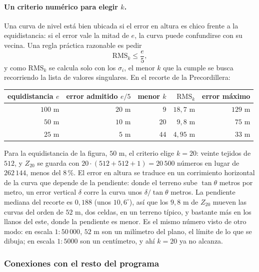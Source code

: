 \paragraph{Un criterio numérico para elegir \(k\).} Una curva de nivel está bien ubicada si
el error en altura es chico frente a la equidistancia: si el error vale la mitad de \(e\), la
curva puede confundirse con su vecina. Una regla práctica razonable es pedir
\[
  \mathrm{RMS}_k\le\frac{e}{5},
\]
y como \(\mathrm{RMS}_k\) se calcula solo con los \(\sigma_i\), el menor \(k\) que la cumple
se busca recorriendo la lista de valores singulares. En el recorte de la Precordillera:

{\small
\begin{center}
\begin{tabular}{r r r r r}
\toprule
equidistancia \(e\) & error admitido \(e/5\) & menor \(k\) & \(\mathrm{RMS}_k\) & error máximo\\
\midrule
\(100\) m & \(20\) m & \(9\) & \(18{,}7\) m & \(129\) m\\
\(50\) m & \(10\) m & \(20\) & \(9{,}8\) m & \(75\) m\\
\(25\) m & \(5\) m & \(44\) & \(4{,}95\) m & \(33\) m\\
\bottomrule
\end{tabular}
\end{center}
}

Para la equidistancia de la figura, \(50\) m, el criterio elige \(k=20\): veinte tejidos de
\(512\), y \(Z_{20}\) se guarda con \(20\cdot(512+512+1)=20\,500\) números en lugar de
\(262\,144\), menos del \(8\)\,\%. El error en altura se traduce en un corrimiento horizontal
de la curva que depende de la pendiente: donde el terreno sube \(\tan\theta\) metros por
metro, un error vertical \(\delta\) corre la curva unos \(\delta/\tan\theta\) metros. La
pendiente mediana del recorte es \(0{,}188\) (unos \(10{,}6^\circ\)), así que los \(9{,}8\) m
de \(Z_{20}\) mueven las curvas del orden de \(52\) m, dos celdas, en un terreno típico, y
bastante más en los llanos del este, donde la pendiente es menor. Es el mismo número visto de
otro modo: en escala \(1\!:\!50\,000\), \(52\) m son un milímetro del plano, el límite de lo
que se dibuja; en escala \(1\!:\!5000\) son un centímetro, y ahí \(k=20\) ya no alcanza.

\subsubsection{Conexiones con el resto del programa}\label{sec:svd-dem-conexiones}

